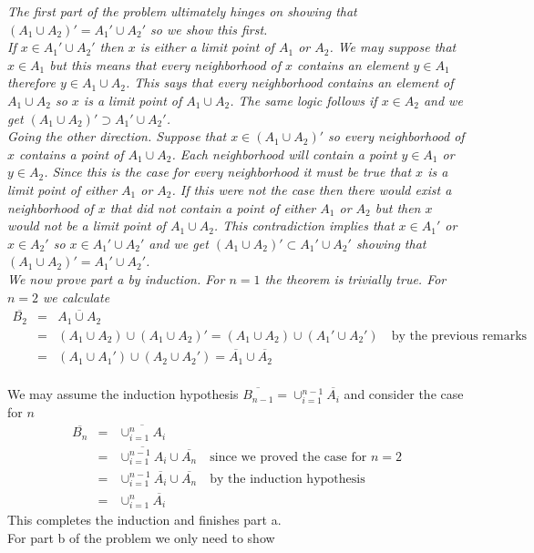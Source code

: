 \documentclass[a4paper,12pt]{book}
\newcommand{\solution}[1]{{\itshape #1}}
\begin{document}
\solution{%
The first part of the problem ultimately hinges on showing that \\$(A_1 \cup A_2)' = A_1' \cup A_2'$ so we show this first.\\
\indent If $x \in A_1' \cup A_2'$ then $x$ is either a limit point of $A_1$ or $A_2$. We may suppose that $x \in A_1$ but this means that every neighborhood of $x$ contains an element $y \in A_1$ therefore $y \in A_1 \cup A_2$. This says that every neighborhood contains an element of $A_1 \cup A_2$ so $x$ is a limit point of $A_1 \cup A_2$. The same logic follows if $x \in A_2$ and we get $(A_1 \cup A_2)' \supset A_1' \cup A_2'$.\\
\indent Going the other direction. Suppose that $x \in (A_1 \cup A_2)' $ so every neighborhood of $x$ contains a point of $A_1 \cup A_2$. Each neighborhood will contain a point $y \in A_1$ or $y \in A_2$. Since this is the case for every neighborhood it must be true that $x$ is a limit point of either $A_1$ or $A_2$. If this were not the case then there would exist a neighborhood of $x$ that did not contain a point of either $A_1$ or $A_2$ but then $x$ would not be a limit point of $A_1 \cup A_2$. This contradiction implies that $x \in A_1'$ or $x \in A_2'$ so $x  \in A_1' \cup A_2 '$ and we get $(A_1 \cup A_2)' \subset A_1' \cup A_2'$ showing that $(A_1 \cup A_2)' = A_1' \cup A_2'$. \\

We now prove part a by induction. For $n = 1$ the theorem is trivially true. For $n = 2$ we calculate
\begin{eqnarray*}
\overline{B_2} &=& \overline{A_1 \cup A_2}\\
 &=& (A_1 \cup A_2) \cup (A_1 \cup A_2)' =  (A_1 \cup A_2) \cup (A_1' \cup A_2') \quad \text{by the previous remarks}\\
 &=& (A_1 \cup A_1') \cup (A_2 \cup A_2') =  \overline{A_1} \cup \overline{A_2}\\
\end{eqnarray*}

We may assume the induction hypothesis $\overline{B_{n-1}} = \cup^{n-1}_{i = 1} \overline{A_i}$ and consider the case for $n$
\begin{eqnarray*}
\overline{B_n} &=& \overline{\cup^n_{i = 1} A_i} \\
&=& \overline{\cup^{n-1}_{i = 1} A_i} \cup \overline{A_n} \quad \text{since we proved the case for $n = 2$} \\
&=& \cup^{n-1}_{i = 1} \overline{A_i} \cup \overline{A_n} \quad \text{by the induction hypothesis}\\
&=& \cup^n_{i = 1} \overline{A_i}
\end{eqnarray*}
This completes the induction and finishes part a.\\

For part b of the problem we only need to show 
}
\end{document}
